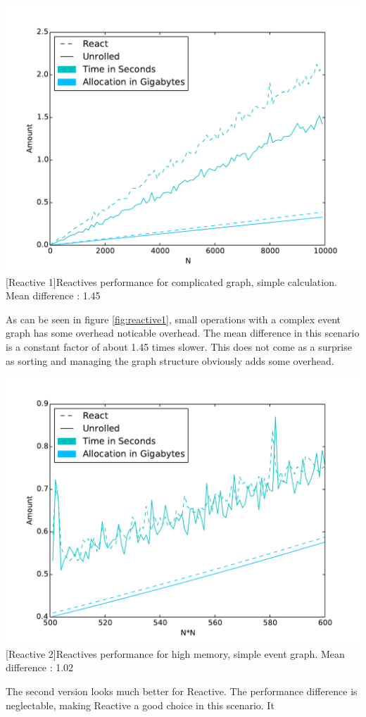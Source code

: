 \begin{minipage}{\linewidth}
    \centering
    \includegraphics[width=0.9\linewidth]{graphics/react_bench_2.pdf}
    [Reactive 1]{Reactives performance for complicated graph, simple calculation. Mean difference : 1.45}
    \label{fig:reactive1}
\end{minipage}
As can be seen in figure \ref{fig:reactive1}, small operations with a complex event graph has some overhead noticable overhead. The mean difference in this scenario is a constant factor of about 1.45 times slower.
This does not come as a surprise as sorting and managing the graph structure obviously adds some overhead.

\vspace{1em}
\begin{minipage}{\linewidth}
    \centering
    \includegraphics[width=0.9\linewidth]{graphics/react_bench_1.pdf}
    [Reactive 2]{Reactives performance for high memory, simple event graph. Mean difference : 1.02}
    \label{fig:reactive2}
\end{minipage}
\vspace{1em}
The second version looks much better for Reactive. The performance difference is neglectable, making Reactive a good choice in this scenario. It

